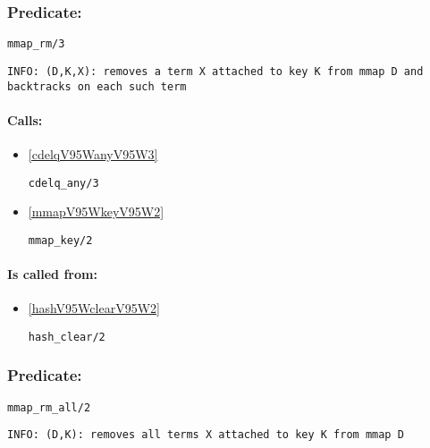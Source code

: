 \subsubsection{Predicate:} \label{mmapV95WrmV95W3}

\begin{verbatim}
mmap_rm/3
\end{verbatim}

{\small \begin{verbatim}
INFO: (D,K,X): removes a term X attached to key K from mmap D and backtracks on each such term

\end{verbatim}}
\paragraph{Calls:} 
\begin{itemize}
\item \ref{cdelqV95WanyV95W3} 
\begin{verbatim}
cdelq_any/3
\end{verbatim}

\item \ref{mmapV95WkeyV95W2} 
\begin{verbatim}
mmap_key/2
\end{verbatim}

\end{itemize}
\paragraph{Is called from:} 
\begin{itemize}
\item \ref{hashV95WclearV95W2} 
\begin{verbatim}
hash_clear/2
\end{verbatim}

\end{itemize}

\subsubsection{Predicate:} \label{mmapV95WrmV95WallV95W2}

\begin{verbatim}
mmap_rm_all/2
\end{verbatim}

{\small \begin{verbatim}
INFO: (D,K): removes all terms X attached to key K from mmap D

\end{verbatim}}

